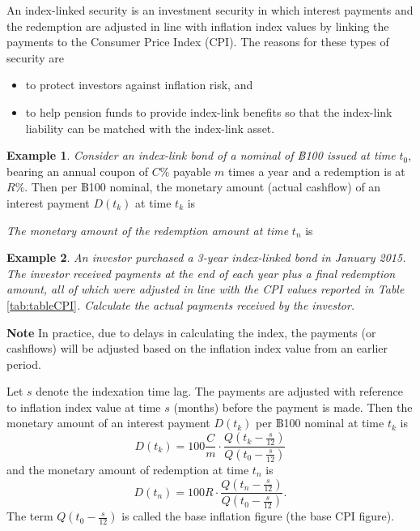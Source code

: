 \documentclass[
]{book}
\theoremstyle{definition}
\theoremstyle{definition}
\newtheorem{example}{Example}[chapter]
\theoremstyle{definition}
\theoremstyle{definition}
\theoremstyle{remark}
\begin{document}
An index-linked security is an investment security in which interest
payments and the redemption are adjusted in line with inflation index
values by linking the payments to the Consumer Price Index (CPI). The
reasons for these types of security are

\begin{itemize}
\item
  to protect investors against inflation risk, and
\item
  to help pension funds to provide index-link benefits so that the
  index-link liability can be matched with the index-link asset.
\end{itemize}

\begin{example}
\emph{Consider an index-link bond of a nominal of ฿100 issued at time} \(t_0\),
bearing an annual coupon of \(C\%\) payable \(m\) times a year and a
redemption is at \(R\%\). Then per ฿100 nominal, the monetary amount
(actual cashflow) of an interest payment \(D(t_k)\) at time \(t_k\) is

\emph{The monetary amount of the redemption amount at time} \(t_n\) is
\end{example}

\begin{example}
\protect\hypertarget{exm:exampleILB}{}\label{exm:exampleILB}\emph{An investor purchased a 3-year index-linked bond in January 2015. The
investor received payments at the end of each year plus a final
redemption amount, all of which were adjusted in line with the CPI
values reported in Table} \ref{tab:tableCPI}\emph{. Calculate the actual
payments received by the investor.}
\end{example}

\textbf{Note} In practice, due to delays in calculating the index, the
payments (or cashflows) will be adjusted based on the inflation index
value from an earlier period.

Let \(s\) denote the indexation time lag. The payments are adjusted with
reference to inflation index value at time \(s\) (months) before the
payment is made. Then the monetary amount of an interest payment
\(D(t_k)\) per ฿100 nominal at time \(t_k\) is
\[\displaystyle D(t_k) = 100 \frac{C}{m} \cdot \frac{Q(t_k - \frac{s}{12})}{Q(t_0 - \frac{s}{12})}\]
and the monetary amount of redemption at time \(t_n\) is
\[D(t_n) = 100 R \cdot \frac{Q(t_n - \frac{s}{12})}{Q(t_0 - \frac{s}{12})}.\]
The term \(Q(t_0 - \frac{s}{12})\) is called the base inflation figure
(the base CPI figure).
\end{document}
